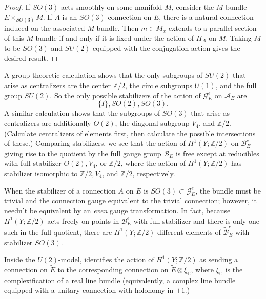 \documentclass{memo-l}
\theoremstyle{definition}
\theoremstyle{remark}
\numberwithin{section}{chapter}
\numberwithin{equation}{chapter}
\begin{document}
\begin{proof}
If $SO(3)$ acts smoothly on some manifold $M$, consider the $M$-bundle $E \times_{SO(3)} M$. If $A$ is an $SO(3)$-connection on $E$, there is a natural connection induced on the associated $M$-bundle. Then $m \in M_x$ extends to a parallel section of this $M$-bundle if and only if it is fixed under the action of $H_A$ on $M$. Taking $M$ to be $SO(3)$ and $SU(2)$ equipped with the conjugation action gives the desired result.\end{proof}
A group-theoretic calculation shows that the only subgroups of $SU(2)$ that arise as centralizers are the center $\mathbb Z/2$, the circle subgroups $U(1)$, and the full group $SU(2)$. So the only possible stabilizers of the action of $\mathcal G^e_E$ on $\mathcal A_E$ are 
$$\{I\}, SO(2), SO(3).$$
A similar calculation shows that the subgroups of $SO(3)$ that arise as centralizers are additionally $O(2)$, the diagonal subgroup $V_4$, and $\mathbb Z/2$. (Calculate centralizers of elements first, then calculate the possible intersections of these.) Comparing stabilizers, we see that the action of $H^1(Y;\mathbb Z/2)$ on $\mathcal B^e_E$ giving rise to the quotient by the full gauge group $\mathcal B_E$ is free except at reducibles with full stabilizer $O(2), V_4$, or $\mathbb Z/2$, where the action of $H^1(Y;\mathbb Z/2)$ has stabilizer isomorphic to $\mathbb Z/2, V_4$, and $\mathbb Z/2$, respectively.

When the stabilizer of a connection $A$ on $E$ is $SO(3) \subset \mathcal G^e_E$, the bundle must be trivial and the connection gauge equivalent to the trivial connection; however, it needn't be equivalent by an \textit{even} gauge transformation. In fact, because $H^1(Y;\mathbb Z/2)$ acts freely on points in $\mathcal B^e_E$ with full stabilizer and there is only one such in the full quotient, there are $H^1(Y;\mathbb Z/2)$ different elements of $\widetilde{\mathcal B}^e_E$ with stabilizer $SO(3)$. 

Inside the $U(2)$-model, \cite[Section~3]{SS} identifies the action of $H^1(Y;\mathbb Z/2)$ as sending a connection on $\tilde E$ to the corresponding connection on $\tilde E \otimes \xi_{\mathbb C}$, where $\xi_{\mathbb C}$ is the complexification of a real line bundle (equivalently, a complex line bundle equipped with a unitary connection with holonomy in $\pm 1$.)
\end{document}
